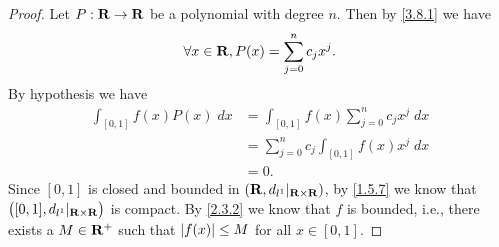 \begin{proof}
  Let \(P : \mathbf{R} \to \mathbf{R}\) be a polynomial with degree \(n\).
  Then by \cref{3.8.1} we have
  \[
    \forall x \in \mathbf{R}, P(x) = \sum_{j = 0}^n c_j x^j.
  \]
  By hypothesis we have
  \begin{align*}
    \int_{[0, 1]} f(x) P(x) \; dx & = \int_{[0, 1]} f(x) \sum_{j = 0}^n c_j x^j \; dx \\
                                  & = \sum_{j = 0}^n c_j \int_{[0, 1]} f(x) x^j \; dx \\
                                  & = 0.
  \end{align*}
  Since \([0, 1]\) is closed and bounded in \((\mathbf{R}, d_{l^1}|_{\mathbf{R} \times \mathbf{R}})\), by \cref{1.5.7} we know that \(\big([0, 1], d_{l^1}|_{\mathbf{R} \times \mathbf{R}}\big)\) is compact.
  By \cref{2.3.2} we know that \(f\) is bounded, i.e., there exists a \(M \in \mathbf{R}^+\) such that \(\left\lvert f(x)\right\rvert \leq M\) for all \(x \in [0, 1]\).


\end{proof}
